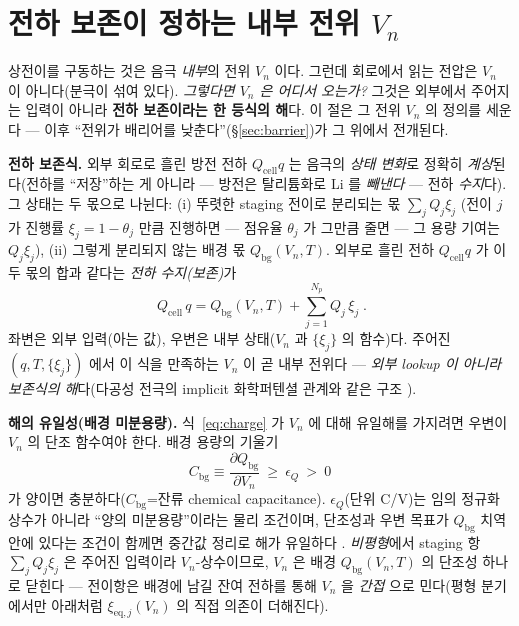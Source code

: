 \documentclass[11pt,a4paper]{article}
\newcommand{\eq}{\mathrm{eq}}
\newcommand{\cell}{\mathrm{cell}}
\newcommand{\bg}{\mathrm{bg}}
\begin{document}
\section{전하 보존이 정하는 내부 전위 $V_n$}\label{sec:stage}
상전이를 구동하는 것은 음극 \emph{내부}의 전위 $V_n$ 이다. 그런데 회로에서 읽는 전압은
$V_n$ 이 아니다(분극이 섞여 있다). \emph{그렇다면 $V_n$ 은 어디서 오는가?} 그것은 외부에서 주어지는 입력이 아니라
\textbf{전하 보존이라는 한 등식의 해}다. 이 절은 그 전위 $V_n$ 의 정의를 세운다 — 이후 ``전위가 배리어를
낮춘다''(\S\ref{sec:barrier})가 그 위에서 전개된다.

\textbf{전하 보존식.} 외부 회로로 흘린 방전 전하 $Q_\cell q$ 는 음극의 \emph{상태 변화}로 정확히 \emph{계상}된다(전하를 ``저장''하는 게
아니라 — 방전은 탈리튬화로 Li 를 \emph{빼낸다} — 전하 \emph{수지}다). 그 상태는 두 몫으로 나뉜다:
(i) 뚜렷한 staging 전이로 분리되는 몫 $\sum_j Q_j\xi_j$ (전이 $j$ 가 진행률 $\xi_j=1-\theta_j$ 만큼 진행하면 — 점유율
$\theta_j$ 가 그만큼 줄면 — 그 용량 기여는 $Q_j\xi_j$), (ii) 그렇게 분리되지 않는 배경 몫 $Q_\bg(V_n,T)$. 외부로 흘린 전하 $Q_\cell q$ 가 이 두 몫의 합과
같다는 \emph{전하 수지(보존)}가
\begin{equation}
\boxed{\;Q_\cell\,q=Q_\bg(V_n,T)+\sum_{j=1}^{N_p}Q_j\,\xi_j\;.}
\label{eq:charge}
\end{equation}
좌변은 외부 입력(아는 값), 우변은 내부 상태($V_n$ 과 $\{\xi_j\}$ 의 함수)다. 주어진 $(q,T,\{\xi_j\})$ 에서 이
식을 만족하는 $V_n$ 이 곧 내부 전위다 — \emph{외부 lookup 이 아니라 보존식의 해}다(다공성 전극의 implicit
화학퍼텐셜 관계와 같은 구조 \cite{mckinnon1983,newman2004}).

\textbf{해의 유일성(배경 미분용량).} 식~\eqref{eq:charge} 가 $V_n$ 에 대해 유일해를 가지려면 우변이 $V_n$ 의
단조 함수여야 한다. 배경 용량의 기울기
\begin{equation}
C_\bg\equiv\frac{\partial Q_\bg}{\partial V_n}\ \ge\ \epsilon_Q\ >\ 0
\label{eq:cbg}
\end{equation}
가 양이면 충분하다($C_\bg$=잔류 chemical capacitance). $\epsilon_Q$(단위 C/V)는 임의 정규화 상수가 아니라 ``양의
미분용량''이라는 물리 조건이며, 단조성과 우변 목표가 $Q_\bg$ 치역 안에 있다는 조건이 함께면 중간값 정리로 해가
유일하다 \cite{bazant2013}. \emph{비평형}에서 staging 항 $\sum_j Q_j\xi_j$ 은 주어진 입력이라 $V_n$-상수이므로,
$V_n$ 은 배경 $Q_\bg(V_n,T)$ 의 단조성 하나로 닫힌다 — 전이항은 배경에 남길 잔여 전하를 통해 $V_n$ 을 \emph{간접}
으로 민다(평형 분기에서만 아래처럼 $\xi_{\eq,j}(V_n)$ 의 직접 의존이 더해진다).
\end{document}
